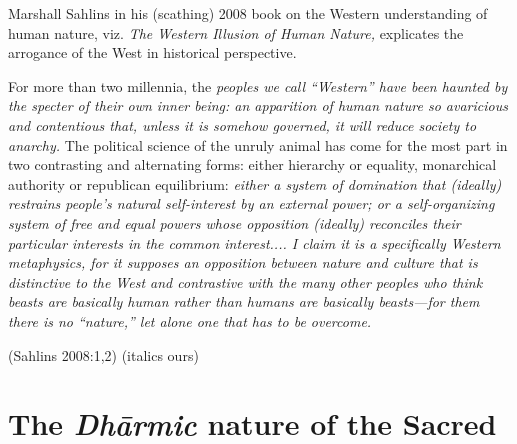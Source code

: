 Marshall Sahlins in his (scathing) 2008 book on the Western understanding of human nature, viz. \textit{The Western Illusion of Human Nature,} explicates the arrogance of the West in historical perspective.

\begin{myquote}
For more than two millennia, the \textit{peoples we call “Western” have been haunted by the specter of their own inner being: an apparition of human nature so avaricious and contentious that, unless it is somehow governed, it will reduce society to anarchy.} The political science of the unruly animal has come for the most part in two contrasting and alternating forms: either hierarchy or equality, monarchical authority or republican equilibrium: \textit{either a system of domination that (ideally) restrains people's natural self-interest by an external power; or a self-organizing system of free and equal powers whose opposition (ideally) reconciles their particular interests in the common interest.... I claim it is a specifically Western metaphysics, for it supposes an opposition between nature and culture that is distinctive to the West and contrastive with the many other peoples who think beasts are basically human rather than humans are basically beasts—for them there is no “nature,” let alone one that has to be overcome.}
\end{myquote}

\hfill (Sahlins 2008:1,2) (italics ours)


\section*{The \textit{Dhārmic} nature of the Sacred}

